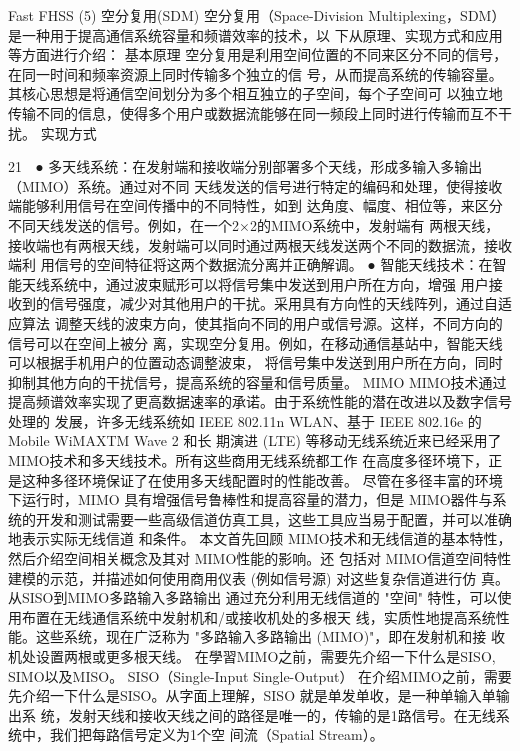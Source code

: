 Fast FHSS
(5) 空分复用(SDM)
空分复用（Space-Division Multiplexing，SDM）是一种用于提高通信系统容量和频谱效率的技术，以
下从原理、实现方式和应用等方面进行介绍：
基本原理
空分复用是利用空间位置的不同来区分不同的信号，在同一时间和频率资源上同时传输多个独立的信
号，从而提高系统的传输容量。其核心思想是将通信空间划分为多个相互独立的子空间，每个子空间可
以独立地传输不同的信息，使得多个用户或数据流能够在同一频段上同时进行传输而互不干扰。
实现方式

                                                           21
 ● 多天线系统：在发射端和接收端分别部署多个天线，形成多输入多输出（MIMO）系统。通过对不同
   天线发送的信号进行特定的编码和处理，使得接收端能够利用信号在空间传播中的不同特性，如到
   达角度、幅度、相位等，来区分不同天线发送的信号。例如，在一个2×2的MIMO系统中，发射端有
   两根天线，接收端也有两根天线，发射端可以同时通过两根天线发送两个不同的数据流，接收端利
   用信号的空间特征将这两个数据流分离并正确解调。
 ● 智能天线技术：在智能天线系统中，通过波束赋形可以将信号集中发送到用户所在方向，增强
   用户接收到的信号强度，减少对其他用户的干扰。采用具有方向性的天线阵列，通过自适应算法
   调整天线的波束方向，使其指向不同的用户或信号源。这样，不同方向的信号可以在空间上被分
   离，实现空分复用。例如，在移动通信基站中，智能天线可以根据手机用户的位置动态调整波束，
   将信号集中发送到用户所在方向，同时抑制其他方向的干扰信号，提高系统的容量和信号质量。
MIMO
MIMO技术通过提高频谱效率实现了更高数据速率的承诺。由于系统性能的潜在改进以及数字信号处理的
发展，许多无线系统如 IEEE 802.11n WLAN、基于 IEEE 802.16e 的 Mobile WiMAXTM Wave 2 和长
期演进 (LTE) 等移动无线系统近来已经采用了 MIMO技术和多天线技术。所有这些商用无线系统都工作
在高度多径环境下，正是这种多径环境保证了在使用多天线配置时的性能改善。
尽管在多径丰富的环境下运行时，MIMO 具有增强信号鲁棒性和提高容量的潜力，但是 MIMO器件与系
统的开发和测试需要一些高级信道仿真工具，这些工具应当易于配置，并可以准确地表示实际无线信道
和条件。
本文首先回顾 MIMO技术和无线信道的基本特性，然后介绍空间相关概念及其对 MIMO性能的影响。还
包括对 MIMO信道空间特性建模的示范，并描述如何使用商用仪表 (例如信号源) 对这些复杂信道进行仿
真。
从SISO到MIMO多路输入多路输出
通过充分利用无线信道的 "空间" 特性，可以使用布置在无线通信系统中发射机和/或接收机处的多根天
线，实质性地提高系统性能。这些系统，现在广泛称为 "多路输入多路输出 (MIMO)"，即在发射机和接
收机处设置两根或更多根天线。
在學習MIMO之前，需要先介绍一下什么是SISO, SIMO以及MISO。
SISO（Single-Input Single-Output）
在介绍MIMO之前，需要先介绍一下什么是SISO。从字面上理解，SISO 就是单发单收，是一种单输入单输出系
统，发射天线和接收天线之间的路径是唯一的，传输的是1路信号。在无线系统中，我们把每路信号定义为1个空
间流（Spatial Stream）。


